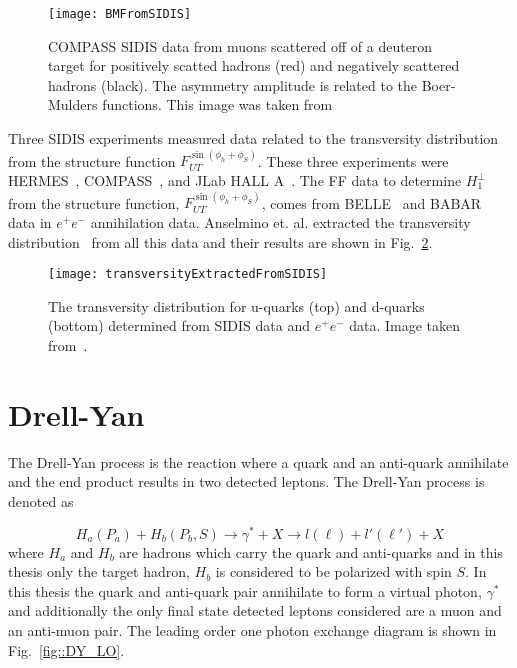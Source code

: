 \begin{figure}[h!t]
  \centering
  \texttt{[image: BMFromSIDIS]}
  \caption{COMPASS SIDIS data from muons scattered off of a deuteron target for
    positively scatted hadrons (red) and negatively scattered hadrons (black).
    The asymmetry amplitude is related to the Boer-Mulders functions.  This
    image was taken from~\cite{Adolph:2014pwc}}
  \label{fig::BMFromSIDIS}
\end{figure}

Three SIDIS experiments measured data related to the transversity distribution
from the structure function $F_{UT}^{\sin(\phi_h +\phi_S)}$.  These three
experiments were HERMES~\cite{Airapetian:2004tw,Airapetian:2010ds},
COMPASS~\cite{Ageev:2006da,Alekseev:2008aa,Alekseev:2010rw,Adolph:2012sn,Adolph:2014zba},
and JLab HALL A~\cite{PhysRevLett.107.072003}.  The FF data to determine
$H_1^{\perp }$ from the structure function, $F_{UT}^{\sin(\phi_h +\phi_S)}$,
comes from BELLE~\cite{Abe:2005zx,Seidl:2008xc} and
BABAR~\cite{TheBABAR:2013yha} data in $e^+e^-$ annihilation data.  Anselmino et. al. extracted the transversity distribution~\cite{PhysRevD.87.094019} from
all this data and their results are shown in
Fig.~\ref{fig::transversityExtractedFromSIDIS}.

\begin{figure}[h!t]
  \centering \texttt{[image: transversityExtractedFromSIDIS]}
  \caption{The transversity distribution for u-quarks (top) and d-quarks
    (bottom) determined from SIDIS data and $e^+e^-$ data.  Image taken
    from~\cite{PhysRevD.87.094019}.}
  \label{fig::transversityExtractedFromSIDIS}
\end{figure}


\section{Drell-Yan} \label{sec::DY}
The Drell-Yan process is the reaction where a quark and an anti-quark annihilate
and the end product results in two detected leptons.  The Drell-Yan process is
denoted as

\begin{equation}
  H_a(P_a) + H_b(P_b, S) \rightarrow \gamma^* + X \rightarrow l(\ell) +
  l'(\ell') + X
\end{equation}
\noindent
where $H_a$ and $H_b$ are hadrons which carry the quark and anti-quarks and in
this thesis only the target hadron, $H_b$ is considered to be polarized with
spin $S$.  In this thesis the quark and anti-quark pair annihilate to form a
virtual photon, $\gamma^*$ and additionally the only final state detected
leptons considered are a muon and an anti-muon pair.  The leading order one
photon exchange diagram is shown in Fig.~\ref{fig::DY_LO}.

